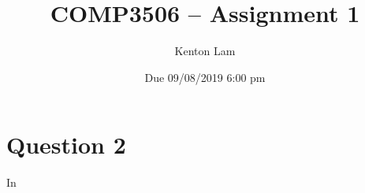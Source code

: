 \documentclass[11pt,a4paper]{article} %
\author{Kenton Lam}
\date{{Due 09/08/2019 6:00 pm}}
\title{COMP3506 -- Assignment 1}
\begin{document}
%

\setcounter{page}{1}
\maketitle
\section*{Question 2}
In 
\end{document}

